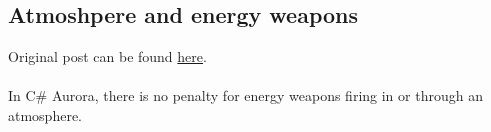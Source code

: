 \documentclass[../../Aurora C# unofficial manual.tex]{subfiles}
\begin{document}
	\subsection{Atmoshpere and energy weapons}
	Original post can be found
	\href{http://aurora2.pentarch.org/index.php?topic=8495.msg107702#msg107702}{here}.
	\\\\
	
	In C\# Aurora, there is no penalty for energy weapons firing in or through an atmosphere.
\end{document}
